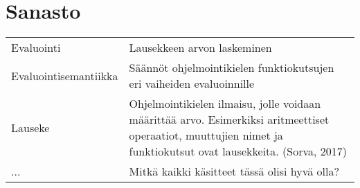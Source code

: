 \section*{Sanasto}

\begin{longtable}{@{}p{}p{}@{}}
Evaluointi & Lausekkeen arvon laskeminen \\
Evaluointisemantiikka & Säännöt ohjelmointikielen funktiokutsujen eri vaiheiden evaluoinnille \\
Lauseke & Ohjelmointikielen ilmaisu, jolle voidaan määrittää arvo. Esimerkiksi aritmeettiset operaatiot, muuttujien nimet ja funktiokutsut ovat lausekkeita. (Sorva, 2017) \\
... & Mitkä kaikki käsitteet tässä olisi hyvä olla?
\end{longtable}
